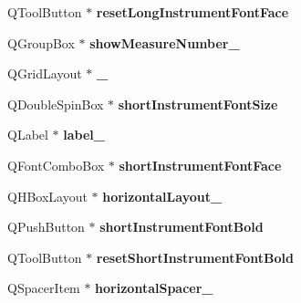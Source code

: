 \begin{DoxyCompactItemize}
Q\+Tool\+Button $\ast$ {\bfseries reset\+Long\+Instrument\+Font\+Face}
\item 
\mbox{\label{class_ui___edit_style_base_a19711bcb54d1f21fae01d0389462b4f9}} 
Q\+Group\+Box $\ast$ {\bfseries show\+Measure\+Number\+\_}
\item 
\mbox{\label{class_ui___edit_style_base_ace6c30793d4c7dd96bfbee62132eef98}} 
Q\+Grid\+Layout $\ast$ {\bfseries \+\_}
\item 
\mbox{\label{class_ui___edit_style_base_a2e400104ae85763c885385826e7e4062}} 
Q\+Double\+Spin\+Box $\ast$ {\bfseries short\+Instrument\+Font\+Size}
\item 
\mbox{\label{class_ui___edit_style_base_a95b0bd48cf15b7824044fdb058f42446}} 
Q\+Label $\ast$ {\bfseries label\+\_}
\item 
\mbox{\label{class_ui___edit_style_base_af4decd722fd6e982c739d1f063621eca}} 
Q\+Font\+Combo\+Box $\ast$ {\bfseries short\+Instrument\+Font\+Face}
\item 
\mbox{\label{class_ui___edit_style_base_a332e1ca6277bd70dbd429f5c3f071cae}} 
Q\+H\+Box\+Layout $\ast$ {\bfseries horizontal\+Layout\+\_}
\item 
\mbox{\label{class_ui___edit_style_base_a4fc36888fe34756e24c4a3c678bde3c2}} 
Q\+Push\+Button $\ast$ {\bfseries short\+Instrument\+Font\+Bold}
\item 
\mbox{\label{class_ui___edit_style_base_a2d821dc2839cf59d80ea8502002a9aff}} 
Q\+Tool\+Button $\ast$ {\bfseries reset\+Short\+Instrument\+Font\+Bold}
\item 
\mbox{\label{class_ui___edit_style_base_a45a573a419c210fd0a77604f8a012213}} 
Q\+Spacer\+Item $\ast$ {\bfseries horizontal\+Spacer\+\_}
\item 
\mbox{\label{class_ui___edit_style_base_aa81ab410f26e678b2b3de5464bbbe68e}} 

\end{DoxyCompactItemize}
